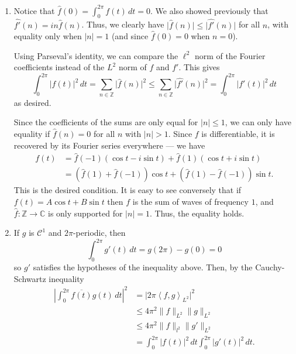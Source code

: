 \documentclass[12 pt, letterpaper]{hmcpset}
\begin{document}
\begin{solution}
	\begin{enumerate}
		\item Notice that $\hat{f}(0) = \int_{0}^{2 \pi} f(t) \, dt = 0$. We also showed previously that $\hat{f'}(n) = in \hat{f}(n)$. Thus, we clearly have $\lvert \hat{f}(n) \rvert \le \lvert \hat{f'}(n) \rvert$ for all $n$, with equality only when $\lvert n \rvert = 1$ (and since $\hat{f}(0) = 0$ when $n = 0$).

			Using Parseval's identity, we can compare the $\ell^{2}$ norm of the Fourier coefficients instead of the $L^{2}$ norm of $f$ and $f'$. This gives
			\[
				\int_{0}^{2 \pi} \lvert f(t) \rvert^{2} \, dt = \sum_{n \in \mathbb{Z}} \lvert \hat{f}(n) \rvert^{2} \le \sum_{n \in \mathbb{Z}} \lvert \hat{f'}(n) \rvert^{2} = \int_{0}^{2 \pi} \lvert f'(t) \rvert^{2} \, dt
			\]
			as desired. 

			Since the coefficients of the sums are only equal for $\lvert n \rvert \le 1$, we can only have equality if $\hat{f}(n) = 0$ for all $n$ with $\lvert n \rvert > 1$. Since $f$ is differentiable, it is recovered by its Fourier series everywhere --- we have
			\begin{align*}
				f(t) & = \hat{f}(-1)(\cos{t} - i \sin{t}) + \hat{f}(1) (\cos{t} + i \sin{t}) \\
				     & = (\hat{f}(1) + \hat{f}(-1)) \cos{t} + (\hat{f}(1) - \hat{f}(-1)) \sin{t}.
			\end{align*}
			This is the desired condition. It is easy to see conversely that if $f(t) = A \cos{t} + B \sin{t}$ then $f$ is the sum of waves of frequency $1$, and $\hat{f} : \mathbb{Z} \to \mathbb{C}$ is only supported for $\lvert n \rvert = 1$. Thus, the equality holds.

		\item If $g$ is $\mathcal{C}^{1}$ and $2 \pi$-periodic, then
			 \[
				\int_{0}^{2 \pi} g'(t) \, dt = g(2 \pi) - g(0) = 0
			\]
			so $g'$ satisfies the hypotheses of the inequality above. Then, by the Cauchy-Schwartz inequality
			\begin{align*}
				\left \lvert \int_{0}^{2 \pi} \overline{f(t)} g(t) \, dt \right \rvert^{2} & = \lvert 2 \pi \left < f, g \right >_{L^{2}} \rvert^{2} \\
													   & \le 4 \pi^{2} \lVert f \rVert_{L^{2}} \lVert g \rVert_{L^{2}} \\
													   & \le 4 \pi^{2} \lVert f \rVert_{l^{2}} \lVert g' \rVert_{L^{2}} \\
													   & = \int_{0}^{2 \pi} \lvert f(t) \rvert^{2} \, dt \int_{0}^{2 \pi} \lvert g'(t) \rvert^{2} \, dt.
			\end{align*}


\end{enumerate}
\end{solution}
\end{document}
